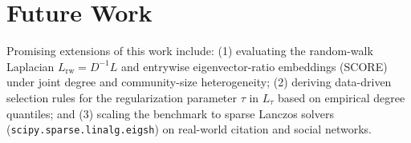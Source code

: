\documentclass[10pt,twocolumn,a4paper]{article}
\begin{document}
\section{Future Work}
Promising extensions of this work include: (1) evaluating the random-walk Laplacian $L_{\mathrm{rw}} = D^{-1}L$ and entrywise eigenvector-ratio embeddings (SCORE) under joint degree and community-size heterogeneity; (2) deriving data-driven selection rules for the regularization parameter $\tau$ in $L_\tau$ based on empirical degree quantiles; and (3) scaling the benchmark to sparse Lanczos solvers (\texttt{scipy.sparse.linalg.eigsh}) on real-world citation and social networks.



\end{document}
